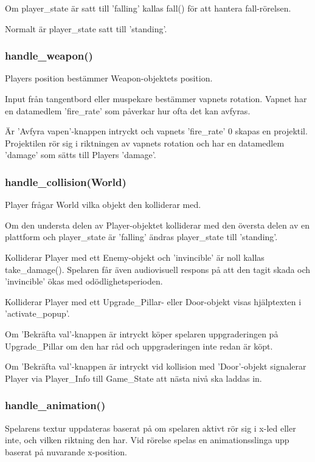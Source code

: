 \documentclass{TDP005mall}
\begin{document}
Om player\_state är satt till 'falling' kallas fall() för att hantera fall-rörelsen.

Normalt är player\_state satt till 'standing'. 


\subsubsection{handle\_weapon()}
Players position bestämmer Weapon-objektets position. 

Input från tangentbord eller muspekare bestämmer vapnets rotation.
Vapnet har en datamedlem 'fire\_rate' som påverkar hur ofta det kan avfyras. 

Är 'Avfyra vapen'-knappen intryckt och vapnets 'fire\_rate' 0 skapas en projektil.
Projektilen rör sig i riktningen av vapnets rotation och har en datamedlem 'damage' som sätts till Players 'damage'.

\subsubsection{handle\_collision(World)}
Player frågar World vilka objekt den kolliderar med. 

Om den understa delen av Player-objektet kolliderar med den översta delen av en plattform och player\_state är 'falling' ändras player\_state till 'standing'.

Kolliderar Player med ett Enemy-objekt och 'invincible' är noll kallas take\_damage(). Spelaren får även audiovisuell respons på att den tagit skada och 'invincible' ökas med odödlighetsperioden.

Kolliderar Player med ett Upgrade\_Pillar- eller  Door-objekt visas hjälptexten i 'activate\_popup'.

Om 'Bekräfta val'-knappen är intryckt köper spelaren uppgraderingen på Upgrade\_Pillar om den har råd och uppgraderingen inte redan är köpt. 

Om 'Bekräfta val'-knappen är intryckt vid kollision med 'Door'-objekt signalerar Player via Player\_Info till Game\_State att nästa nivå ska laddas in.

\subsubsection{handle\_animation()}
Spelarens textur uppdateras baserat på om spelaren aktivt rör sig i x-led eller inte, och vilken riktning den har. Vid rörelse spelas en animationsslinga upp baserat på nuvarande x-position.
\end{document}
